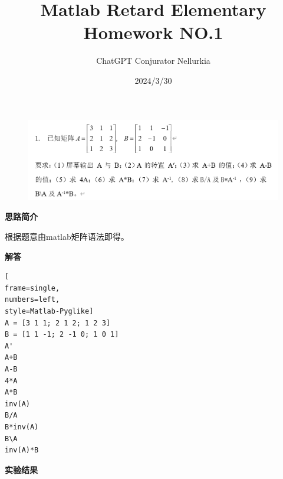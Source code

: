 \documentclass[12pt,UTF8]{ctexart}
\title{Matlab Retard Elementary Homework NO.1}
\author{ChatGPT Conjurator Nellurkia}
\date{2024/3/30}
\begin{document}
\maketitle

\clearpage

\begin{figure}
    \includegraphics[width=1\linewidth]{image.png}
\end{figure}

\par \textbf{思路简介}
\par 根据题意由matlab矩阵语法即得。
\par \textbf{解答}

\begin{lstlisting}[
frame=single,
numbers=left,
style=Matlab-Pyglike]
A = [3 1 1; 2 1 2; 1 2 3]
B = [1 1 -1; 2 -1 0; 1 0 1]
A'
A+B
A-B
4*A
A*B
inv(A)
B/A
B*inv(A)
B\A
inv(A)*B
\end{lstlisting}

\par \textbf{实验结果}
\end{document}
